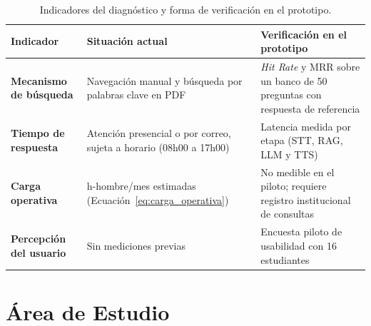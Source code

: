 \begin{table}[H]
  \caption{Indicadores del diagnóstico y forma de verificación en el prototipo.}
  \label{tab:metricas_diagnostico_metodologia}
\centering
\small
\setlength{\tabcolsep}{4pt}
\renewcommand{\arraystretch}{1.25}
\begin{tabular}{|>{\raggedright\arraybackslash}p{3.3cm}|>{\raggedright\arraybackslash}p{4.4cm}|>{\raggedright\arraybackslash}p{5.3cm}|}
\hline
\rowcolor[HTML]{EFEFEF}
\textbf{Indicador} & \textbf{Situación actual} & \textbf{Verificación en el prototipo} \\ \hline
\textbf{Mecanismo de búsqueda} & Navegación manual y búsqueda por palabras clave en PDF & \textit{Hit Rate} y MRR sobre un banco de 50 preguntas con respuesta de referencia \\ \hline
\textbf{Tiempo de respuesta} & Atención presencial o por correo, sujeta a horario (08h00 a 17h00) & Latencia medida por etapa (STT, RAG, LLM y TTS) \\ \hline
\textbf{Carga operativa} & 76 h-hombre/mes estimadas (Ecuación~\ref{eq:carga_operativa}) & No medible en el piloto; requiere registro institucional de consultas \\ \hline
\textbf{Percepción del usuario} & Sin mediciones previas & Encuesta piloto de usabilidad con 16 estudiantes \\ \hline
\end{tabular}
\elaboradopor{\autorTFG}
\end{table}

\section{Área de Estudio}

